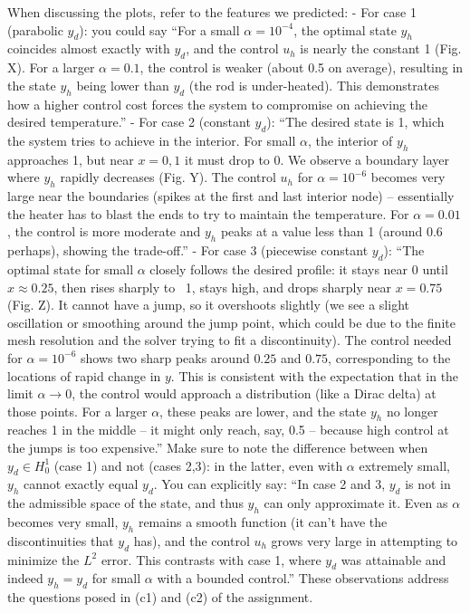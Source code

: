 \documentclass[a4paper,10pt]{article}
\begin{document}
When discussing the plots, refer to the features we predicted:
- For case 1 (parabolic \(y_d\)): you could say “For a small \(\alpha=10^{-4}\), the optimal state \(y_h\) coincides almost exactly with \(y_d\), and the control \(u_h\) is nearly the constant 1 (Fig. X). For a larger \(\alpha=0.1\), the control is weaker (about 0.5 on average), resulting in the state \(y_h\) being lower than \(y_d\) (the rod is under-heated). This demonstrates how a higher control cost forces the system to compromise on achieving the desired temperature.”
- For case 2 (constant \(y_d\)): “The desired state is 1, which the system tries to achieve in the interior. For small \(\alpha\), the interior of \(y_h\) approaches 1, but near \(x=0,1\) it must drop to 0. We observe a boundary layer where \(y_h\) rapidly decreases (Fig. Y). The control \(u_h\) for \(\alpha=10^{-6}\) becomes very large near the boundaries (spikes at the first and last interior node) – essentially the heater has to blast the ends to try to maintain the temperature. For \(\alpha=0.01\), the control is more moderate and \(y_h\) peaks at a value less than 1 (around 0.6 perhaps), showing the trade-off.”
- For case 3 (piecewise constant \(y_d\)): “The optimal state for small \(\alpha\) closely follows the desired profile: it stays near 0 until \(x\approx0.25\), then rises sharply to ~1, stays high, and drops sharply near \(x=0.75\) (Fig. Z). It cannot have a jump, so it overshoots slightly (we see a slight oscillation or smoothing around the jump point, which could be due to the finite mesh resolution and the solver trying to fit a discontinuity). The control needed for \(\alpha=10^{-6}\) shows two sharp peaks around \(0.25\) and \(0.75\), corresponding to the locations of rapid change in \(y\). This is consistent with the expectation that in the limit \(\alpha \to 0\), the control would approach a distribution (like a Dirac delta) at those points. For a larger \(\alpha\), these peaks are lower, and the state \(y_h\) no longer reaches 1 in the middle – it might only reach, say, 0.5 – because high control at the jumps is too expensive.” Make sure to note the difference between when \(y_d \in H^1_0\) (case 1) and not (cases 2,3): in the latter, even with \(\alpha\) extremely small, \(y_h\) cannot exactly equal \(y_d\). You can explicitly say: “In case 2 and 3, \(y_d\) is not in the admissible space of the state, and thus \(y_h\) can only approximate it. Even as \(\alpha\) becomes very small, \(y_h\) remains a smooth function (it can't have the discontinuities that \(y_d\) has), and the control \(u_h\) grows very large in attempting to minimize the \(L^2\) error. This contrasts with case 1, where \(y_d\) was attainable and indeed \(y_h = y_d\) for small \(\alpha\) with a bounded control.” These observations address the questions posed in (c1) and (c2) of the assignment.
\end{document}
